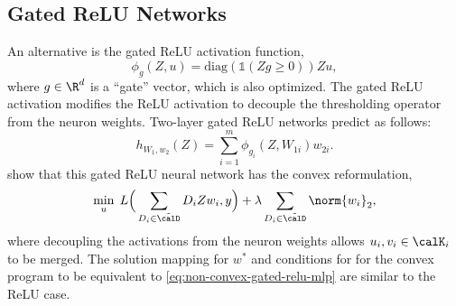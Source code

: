 \subsection{Gated ReLU Networks}

An alternative is the gated ReLU activation function,
\[
	\phi_{g}(Z, u) = \text{diag}(\mathds{1}(Z g \geq 0)) Z u,
\]
where \( g \in \R^d \) is a ``gate'' vector, which is also optimized.
The gated ReLU activation modifies the ReLU activation to
decouple the thresholding operator from the neuron weights.
Two-layer gated ReLU networks predict as follows:
\begin{equation}\label{eq:non-convex-gated-relu-mlp}
	h_{W_1, w_2}(Z) = \sum_{i=1}^m \phi_{g_i}(Z, W_{1i}) w_{2i}.
\end{equation}
\citet{mishkin2022convex} show that this gated ReLU neural network has
the convex reformulation,
\begin{equation}\label{eq:convex-gated-relu-mlp}
	\min_{u} \; L\Big(\sum_{D_i \in \tilde \calD} D_i Z w_i, y\Big)
	+ \lambda \sum_{D_i \in \tilde \calD} \norm{w_i}_2,
\end{equation}
where decoupling the activations from the neuron weights
allows \( u_i, v_i \in \calK_i \) to be merged.
The solution mapping for \( w^* \) and conditions for
for the convex program to be equivalent to
\cref{eq:non-convex-gated-relu-mlp} are similar to the ReLU case.



